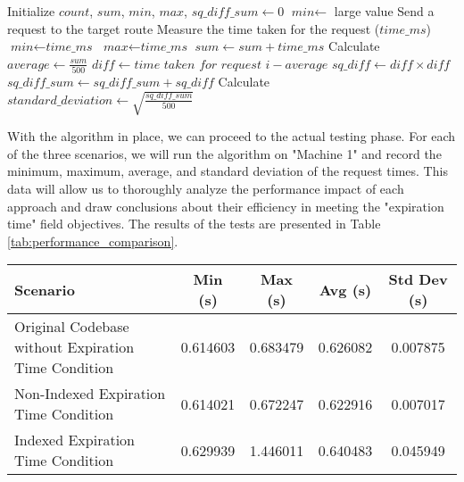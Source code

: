 \documentclass[a4paper,fleqn]{cas-dc}
\begin{document}
\begin{algorithm}
\caption{Pseudocode for Time Measurement}\label{alg:time_measurement}
\begin{algorithmic}[1]
\State Initialize $\textit{count}$, $\textit{sum}$, $\textit{min}$, $\textit{max}$, $\textit{sq\_diff\_sum} \gets 0$
\State $\textit{min} \gets$ large value
    \State Send a request to the target route
    \State Measure the time taken for the request ($\textit{time\_ms}$)
        \State $\textit{min} \gets \textit{time\_ms}$
    \EndIf
        \State $\textit{max} \gets \textit{time\_ms}$
    \EndIf
    \State $\textit{sum} \gets \textit{sum} + \textit{time\_ms}$
\EndFor
\State Calculate $\textit{average} \gets \frac{\textit{sum}}{500}$
    \State $\textit{diff} \gets \textit{time taken for request i} - \textit{average}$
    \State $\textit{sq\_diff} \gets \textit{diff} \times \textit{diff}$
    \State $\textit{sq\_diff\_sum} \gets \textit{sq\_diff\_sum} + \textit{sq\_diff}$
\EndFor
\State Calculate $\textit{standard\_deviation} \gets \sqrt{\frac{\textit{sq\_diff\_sum}}{500}}$
\end{algorithmic}
\end{algorithm}

With the algorithm in place, we can proceed to the actual testing phase. For each of the three scenarios, we will run the algorithm on "Machine 1" and record the minimum, maximum, average, and standard deviation of the request times. This data will allow us to thoroughly analyze the performance impact of each approach and draw conclusions about their efficiency in meeting the "expiration time" field objectives. The results of the tests are presented in Table \ref{tab:performance_comparison}.

\begin{table*}[htbp]
\centering
\caption{Performance comparison of the three scenarios}
\begin{tabular}{lcccc}
\hline
Scenario & Min (s) & Max (s) & Avg (s) & Std Dev (s) \\ \hline
Original Codebase without Expiration Time Condition & 0.614603 & 0.683479 & 0.626082 & 0.007875 \\
Non-Indexed Expiration Time Condition & 0.614021 & 0.672247 & 0.622916 & 0.007017 \\
Indexed Expiration Time Condition & 0.629939 & 1.446011 & 0.640483 & 0.045949 \\ \hline
\end{tabular}
\label{tab:performance_comparison}
\end{table*}
\end{document}
